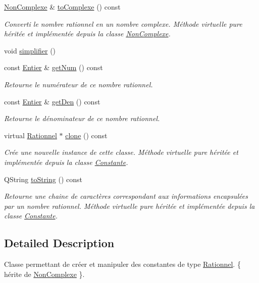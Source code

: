 \begin{DoxyCompactItemize}
\hyperlink{classNonComplexe}{\-Non\-Complexe} \& \hyperlink{classRationnel_a5f58000bd9f49cb352b389460e4ec7d9}{to\-Complexe} () const 
\begin{DoxyCompactList}\small\item\em \-Converti le nombre rationnel en un nombre complexe. \-Méthode virtuelle pure héritée et implémentée depuis la classe \hyperlink{classNonComplexe}{\-Non\-Complexe}. \end{DoxyCompactList}\item 
void \hyperlink{classRationnel_a12ee060e5fca5f4291b222983d727268}{simplifier} ()
\item 
const \hyperlink{classEntier}{\-Entier} \& \hyperlink{classRationnel_aace94cd795afce78654255e32d627910}{get\-Num} () const 
\begin{DoxyCompactList}\small\item\em \-Retourne le numérateur de ce nombre rationnel. \end{DoxyCompactList}\item 
const \hyperlink{classEntier}{\-Entier} \& \hyperlink{classRationnel_aa0a393337f84b8aa3f1fa8958b551d7e}{get\-Den} () const 
\begin{DoxyCompactList}\small\item\em \-Retourne le dénominateur de ce nombre rationnel. \end{DoxyCompactList}\item 
virtual \hyperlink{classRationnel}{\-Rationnel} $\ast$ \hyperlink{classRationnel_a422ec3e0c4465d08c4e9deceda6c442c}{clone} () const 
\begin{DoxyCompactList}\small\item\em \-Crée une nouvelle instance de cette classe. \-Méthode virtuelle pure héritée et implémentée depuis la classe \hyperlink{classConstante}{\-Constante}. \end{DoxyCompactList}\item 
\-Q\-String \hyperlink{classRationnel_a41bc89d21ce161818f67ccfe296766c0}{to\-String} () const 
\begin{DoxyCompactList}\small\item\em \-Retourne une chaine de caractères correspondant aux informations encapsulées par un nombre rationnel. \-Méthode virtuelle pure héritée et implémentée depuis la classe \hyperlink{classConstante}{\-Constante}. \end{DoxyCompactList}\end{DoxyCompactItemize}


\subsection{\-Detailed \-Description}
\-Classe permettant de créer et manipuler des constantes de type \hyperlink{classRationnel}{\-Rationnel}. \{ hérite de \hyperlink{classNonComplexe}{\-Non\-Complexe} \}. 

